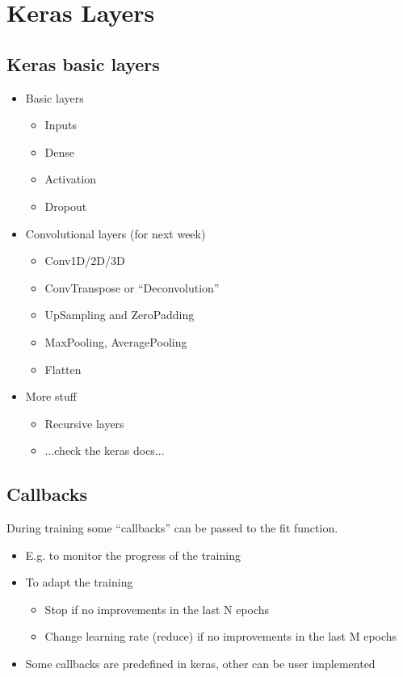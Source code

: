 \section{Keras Layers}
\subsection{Keras basic layers}

\begin{itemize}
	\item Basic layers
\begin{itemize}
	\item Inputs
	\item Dense
	\item Activation
	\item Dropout
\end{itemize}
	\item Convolutional layers (for next week)
\begin{itemize}
	\item Conv1D/2D/3D
	\item ConvTranspose or “Deconvolution”
	\item UpSampling and ZeroPadding
	\item MaxPooling, AveragePooling
	\item Flatten
\end{itemize}
	\item More stuff
\begin{itemize}
	\item Recursive layers
	\item ...check the keras docs...
\end{itemize}
\end{itemize}

\subsection{Callbacks}
During training some “callbacks” can be passed to the fit function.
\begin{itemize}
	\item E.g. to monitor the progress of the training
	\item To adapt the training
	\begin{itemize}
		\item Stop if no improvements in the last N epochs
		\item Change learning rate (reduce) if no improvements in the last M epochs
	\end{itemize}
	\item Some callbacks are predefined in keras, other can be user implemented
\end{itemize}

